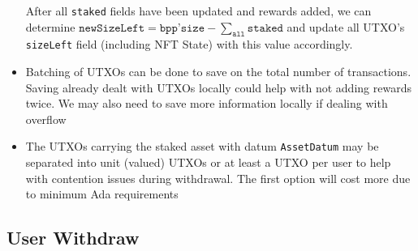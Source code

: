 \documentclass[10pt, a4paper]{article}
\theoremstyle{definition}
\begin{document}
\begin{itemize}
{
After all \texttt{staked} fields have been updated and rewards added, we can determine $\texttt{newSizeLeft} = \texttt{bpp'size} - \sum_\texttt{all} \texttt{staked}$ and update all UTXO's \texttt{sizeLeft} field (including NFT State) with this value accordingly.
}
\item{Batching of UTXOs can be done to save on the total number of transactions. Saving already dealt with UTXOs locally could help with not adding rewards twice. We may also need to save more information locally if dealing with overflow}
\item{The UTXOs carrying the staked asset with datum \texttt{AssetDatum} may be separated into unit (valued) UTXOs or at least a UTXO per user to help with contention issues during withdrawal. The first option will cost more due to minimum Ada requirements}
\end{itemize}

\subsection{User Withdraw}\label{subsection:UserWithdraw}
\end{document}
